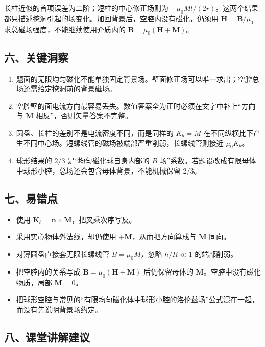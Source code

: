 \documentclass[12pt,a4paper,UTF8]{ctexart}
\newcommand{\tightlist}{\setlength{\itemsep}{0pt}\setlength{\parskip}{0pt}}
\begin{document}
长柱近似的首项误差为二阶；短柱的中心修正场则为
\(-\mu_0Ml/(2r)\)。这两个结果都只描述挖洞引起的场变化。加回背景后，空腔内没有磁化，仍须用
\(\bm H=\bm B/\mu_0\) 求总磁场强度，不能继续使用介质内的
\(\bm B=\mu_0(\bm H+\bm M)\)。

\subsection{六、关键洞察}\label{ux516dux5173ux952eux6d1eux5bdf-2}

\begin{enumerate}
\def\labelenumi{\arabic{enumi}.}
\tightlist
\item
  题面的无限均匀磁化不能单独固定背景场。壁面修正场可以唯一求出；空腔总场还需给定挖洞前的背景磁场。
\item
  空腔壁的面电流方向最容易丢失。数值答案全为正时必须在文字中补上``方向与
  \(\bm M\) 相反''，否则矢量答案不完整。
\item
  圆盘、长柱的差别不是电流密度不同，而是同样的 \(K_b=M\)
  在不同纵横比下产生不同中心场。短螺线管的磁场被端部严重削弱，长螺线管则接近
  \(\mu_0K_b\)。
\item
  球形结果的 \(2/3\) 是``均匀磁化球自身内部的 \(B\)
  场''系数。若题设改成有限母体中球形小腔，总场还会包含母体背景，不能机械保留
  \(2/3\)。
\end{enumerate}

\subsection{七、易错点}\label{ux4e03ux6613ux9519ux70b9-2}

\begin{itemize}
\tightlist
\item
  使用 \(\bm K_b=\bm n\times\bm M\)，把叉乘次序写反。
\item
  采用实心物体外法线，却仍使用 \(+\bm M\)，从而把方向算成与 \(\bm M\)
  同向。
\item
  对薄圆盘直接套无限长螺线管 \(B=\mu_0M\)，忽略 \(h/R\ll1\) 的端部削弱。
\item
  把空腔内的关系写成 \(\bm B=\mu_0(\bm H+\bm M)\) 后仍保留母体的
  \(\bm M\)。空腔中没有磁化物质，局部 \(\bm M=0\)。
\item
  把球形空腔与常见的``有限均匀磁化体中球形小腔的洛伦兹场''公式混在一起，而没有先说明背景场约定。
\end{itemize}

\subsection{八、课堂讲解建议}\label{ux516bux8bfeux5802ux8bb2ux89e3ux5efaux8bae-2}
\end{document}
